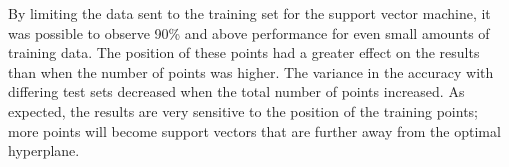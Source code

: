 By limiting the data sent to the training set for the support vector machine, it was possible to observe 90\% and above performance for even small amounts of training data. The position of these points had a greater effect on the results than when the number of points was higher. The variance in the accuracy with differing test sets decreased when the total number of points increased. As expected, the results are very sensitive to the position of the training points; more points will become support vectors that are further away from the optimal hyperplane.
\\







